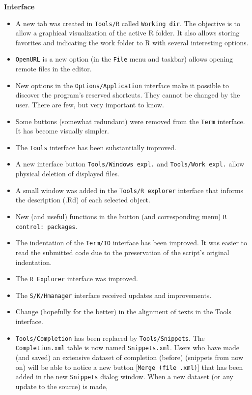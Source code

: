 \textbf{Interface}
\begin{itemize}
  \item A new tab was created in \texttt{Tools/R} called \texttt{Working dir}.
   The objective is to allow a graphical visualization of the active R folder.
   It also allows storing favorites and indicating the work folder to R with several interesting options.
  \item \texttt{OpenURL} is a new option (in the \texttt{File} menu and taskbar) allows opening
   remote files in the editor.
  \item New options in the \texttt{Options/Application} interface make it possible to discover the program's
   reserved shortcuts. They cannot be changed by the user. There are few, but very important to know.
  \item Some buttons (somewhat redundant) were removed from the \texttt{Term} interface.
   It has become visually simpler.
  \item The \texttt{Tools} interface has been substantially improved.
  \item A new interface button \texttt{Tools/Windows expl.} and \texttt{Tools/Work expl.} allow physical
   deletion of displayed files.
  \item A small window was added in the \texttt{Tools/R explorer} interface that informs the
   description (.Rd) of each selected object.
  \item New (and useful) functions in the button (and corresponding menu) \texttt{R control: packages}.
  \item The indentation of the \texttt{Term/IO} interface has been improved. It was easier to read the
   submitted code due to the preservation of the script's original indentation.
  \item The \texttt{R Explorer} interface was improved.
  \item The \texttt{S/K/Hmanager} interface received updates and improvements.
  \item Change (hopefully for the better) in the alignment of texts in the Tools interface.
  \item \texttt{Tools/Completion} has been replaced by \texttt{Tools/Snippets}. The \texttt{Completion.xml}
   table is now named \texttt{Snippets.xml}. Users who have made (and saved) an extensive dataset of completion
   (before) (snippets from now on) will be able to notice a new button [\texttt{Merge (file .xml)}] that has been added
   in the new \texttt{Snippets} dialog window. When a new dataset (or any update to the source) is made,

\end{itemize}

